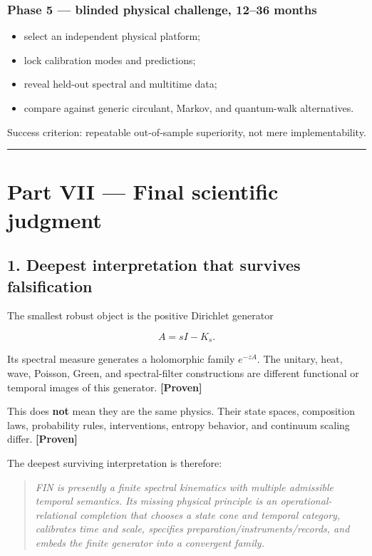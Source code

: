 \documentclass[11pt,a4paper,openany]{report}
\newcommand{\statusProven}{\textcolor{fingreen}{[Proven]}}
\begin{document}
\subsection{Phase 5 — blinded physical challenge, 12–36 months}

\begin{itemize}
\item 
select an independent physical platform;

\item 
lock calibration modes and predictions;

\item 
reveal held-out spectral and multitime data;

\item 
compare against generic circulant, Markov, and quantum-walk alternatives.

\end{itemize}

Success criterion: repeatable out-of-sample superiority, not mere implementability.

\par\medskip\hrule\medskip

\chapter{Part VII — Final scientific judgment}

\section{1. Deepest interpretation that survives falsification}

The smallest robust object is the positive Dirichlet generator

\[
A=sI-K_s.
\]

Its spectral measure generates a holomorphic family \(e^{-zA}\). The unitary, heat, wave, Poisson, Green, and spectral-filter constructions are different functional or temporal images of this generator. \textbf{\statusProven{}}

This does \textbf{not} mean they are the same physics. Their state spaces, composition laws, probability rules, interventions, entropy behavior, and continuum scaling differ. \textbf{\statusProven{}}

The deepest surviving interpretation is therefore:

\begin{quote}\itshape
FIN is presently a finite spectral kinematics with multiple admissible temporal semantics. Its missing physical principle is an operational-relational completion that chooses a state cone and temporal category, calibrates time and scale, specifies preparation/\allowbreak{}instruments/\allowbreak{}records, and embeds the finite generator into a convergent family.

\end{quote}
\end{document}

